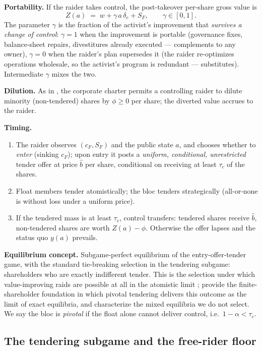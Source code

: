 \textbf{Portability.} If the raider takes control, the post-takeover per-share gross value is
\[
Z(a)\;=\;w+\gamma\,a\,\delta_{e}+S_{F},
\qquad \gamma\in[0,1].
\]
The parameter $\gamma$ is the fraction of the activist's improvement that \emph{survives a change of control}: $\gamma=1$ when the improvement is portable (governance fixes, balance-sheet repairs, divestitures already executed --- complements to any owner), $\gamma=0$ when the raider's plan supersedes it (the raider re-optimizes operations wholesale, so the activist's program is redundant --- substitutes). Intermediate $\gamma$ mixes the two.

\textbf{Dilution.} As in \citet{GrossmanHart1980}, the corporate charter permits a controlling raider to dilute minority (non-tendered) shares by $\phi\ge0$ per share; the diverted value accrues to the raider.

\textbf{Timing.}
\begin{enumerate}
\item The raider observes $(c_{F},S_{F})$ and the public state $a$, and chooses whether to \emph{enter} (sinking $c_{F}$); upon entry it posts a \emph{uniform, conditional, unrestricted} tender offer at price $\hat b$ per share, conditional on receiving at least $\tau_{c}$ of the shares.
\item Float members tender atomistically; the bloc tenders strategically (all-or-none is without loss under a uniform price).
\item If the tendered mass is at least $\tau_{c}$, control transfers: tendered shares receive $\hat b$, non-tendered shares are worth $Z(a)-\phi$. Otherwise the offer lapses and the status quo $y(a)$ prevails.
\end{enumerate}

\textbf{Equilibrium concept.} Subgame-perfect equilibrium of the entry-offer-tender game, with the standard tie-breaking selection in the tendering subgame: shareholders who are exactly indifferent tender. This is the selection under which value-improving raids are possible at all in the atomistic limit \citep{GrossmanHart1980}; \citet{BagnoliLipman1988} provide the finite-shareholder foundation in which pivotal tendering delivers this outcome as the limit of exact equilibria, and \citet{HolmstromNalebuff1992} characterize the mixed equilibria we do not select. We say the bloc is \emph{pivotal} if the float alone cannot deliver control, i.e.\ $1-\alpha<\tau_{c}$.

\subsection{The tendering subgame and the free-rider floor}

